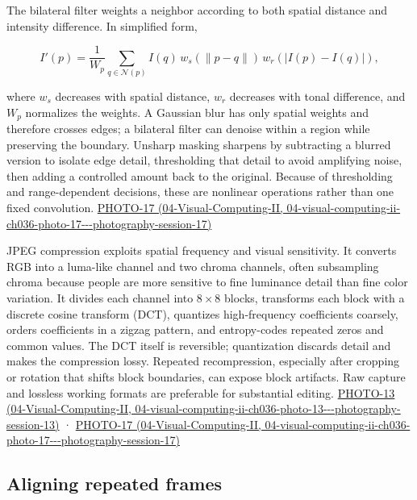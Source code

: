 The bilateral filter weights a neighbor according to both spatial distance and intensity difference. In simplified form,

\[
I'(p)=\frac{1}{W_p}\sum_{q\in\mathcal N(p)} I(q)\,w_s(\|p-q\|)\,w_r(|I(p)-I(q)|),
\]

where \(w_s\) decreases with spatial distance, \(w_r\) decreases with tonal difference, and \(W_p\) normalizes the weights. A Gaussian blur has only spatial weights and therefore crosses edges; a bilateral filter can denoise within a region while preserving the boundary. Unsharp masking sharpens by subtracting a blurred version to isolate edge detail, thresholding that detail to avoid amplifying noise, then adding a controlled amount back to the original. Because of thresholding and range-dependent decisions, these are nonlinear operations rather than one fixed convolution. \href{../04-Visual-Computing-II/main.pdf\#nameddest=04-visual-computing-ii-ch036-photo-17---photography-session-17}{PHOTO-17 (04-Visual-Computing-II, 04-visual-computing-ii-ch036-photo-17-\/-\/-photography-session-17)}

JPEG compression exploits spatial frequency and visual sensitivity. It converts RGB into a luma-like channel and two chroma channels, often subsampling chroma because people are more sensitive to fine luminance detail than fine color variation. It divides each channel into \(8\times8\) blocks, transforms each block with a discrete cosine transform (DCT), quantizes high-frequency coefficients coarsely, orders coefficients in a zigzag pattern, and entropy-codes repeated zeros and common values. The DCT itself is reversible; quantization discards detail and makes the compression lossy. Repeated recompression, especially after cropping or rotation that shifts block boundaries, can expose block artifacts. Raw capture and lossless working formats are preferable for substantial editing. \href{../04-Visual-Computing-II/main.pdf\#nameddest=04-visual-computing-ii-ch036-photo-13---photography-session-13}{PHOTO-13 (04-Visual-Computing-II, 04-visual-computing-ii-ch036-photo-13-\/-\/-photography-session-13)} · \href{../04-Visual-Computing-II/main.pdf\#nameddest=04-visual-computing-ii-ch036-photo-17---photography-session-17}{PHOTO-17 (04-Visual-Computing-II, 04-visual-computing-ii-ch036-photo-17-\/-\/-photography-session-17)}

\subsection{Aligning repeated frames}\label{03-visual-computing-i-ch004-aligning-repeated-frames}

